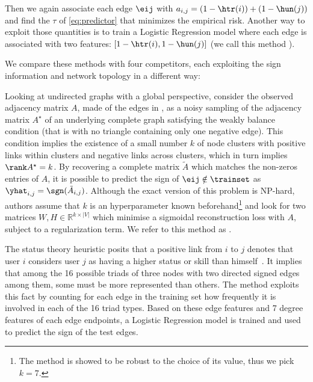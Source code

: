 Then we again associate each edge $\eij$ with $a_{i,j} = \left(1-\htr(i)\right) +
\left(1-\hun(j)\right)$ and find the $\tau$ of \eqref{eq:predictor} that minimizes the empirical
risk.  Another way to exploit those quantities is to train a Logistic Regression model where each
edge is associated with two features: $[1-\htr(i), 1-\hun(j)]$ (we call this method \uslogregp{}).

We compare these methods with four competitors, each exploiting the sign information and network
topology in a different way:

Looking at undirected graphs with a global perspective, \textcite{LowRankCompletion14} consider the
observed adjacency matrix $A$, made of the edges in \trainset{}, as a noisy sampling of the
adjacency matrix $A^\star$ of an underlying complete graph satisfying the weakly balance condition
(that is with no triangle containing only one negative edge).
This condition implies the existence of a small number $k$ of node clusters with positive links
within clusters and negative links across clusters, which in turn implies $\rank A^\star=k$.  By
recovering a complete matrix $\tilde{A}$ which matches the non-zeros entries of $A$, it is possible
to predict the sign of $\eij \notin \trainset$ as $\yhat_{i,j} = \sgn(\tilde{A}_{i,j})$. Although
the exact version of this problem is NP-hard, authors assume that $k$ is an hyperparameter known
beforehand\footnote{The method is showed to be robust to the choice of its value, thus we pick
$k=7$.} and look for two matrices $W,H\in \mathbb{R}^{k\times|V|}$ which minimise a sigmoidal
reconstruction loss with $A$, subject to a regularization term. We refer to this method as
\emph{\complowrank{}}.

The status theory heuristic posits that a positive link from $i$ to $j$ denotes that user $i$
considers user $j$ as having a higher status or skill than himself~\autocite{Leskovec2010}. It
implies that among the 16 possible triads of three nodes with two directed signed edges among them,
some must be more represented than others. The \emph{\comptriads{}} method exploits this fact by
counting for each edge in the training set how frequently it is involved in each of the 16 triad
types. Based on these edge features and 7 degree features of each edge endpoints, a Logistic
Regression model is trained and used to predict the sign of the test edges.

